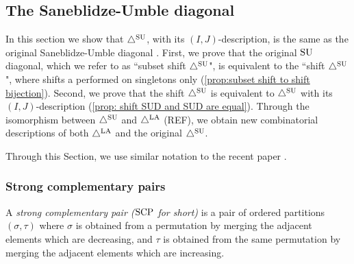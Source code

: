 
\subsection{The Saneblidze-Umble diagonal}

In this section we show that $\triangle^{\mathrm{SU}}$, with its $(I,J)$-description, is the same as the original Saneblidze-Umble diagonal \cite{SaneblidzeUmble04}.
First, we prove that the original $\mathrm{SU}$ diagonal, which we refer to as ``subset shift $\triangle^{\mathrm{SU}}$", is equivalent to the ``shift $\triangle^{\mathrm{SU}}$", where shifts a performed on singletons only (\cref{prop:subset shift to shift bijection}). 
Second, we prove that the shift $\triangle^{\mathrm{SU}}$ is equivalent to $\triangle^{\mathrm{SU}}$ with its $(I,J)$-description (\cref{prop: shift SUD and SUD are equal}). 
Through the isomorphism between $\triangle^{\mathrm{SU}}$ and $\triangle^{\mathrm{LA}}$ (REF), we obtain new combinatorial descriptions of both $\triangle^{\mathrm{LA}}$ and the original $\triangle^{\mathrm{SU}}$. 
\begin{center}
\end{center}
Through this Section, we use similar notation to the recent paper \cite{saneblidzeComparingDiagonalsAssociahedra2022}.


\subsubsection{Strong complementary pairs}

\begin{definition}
A \emph{strong complementary pair ($\mathrm{SCP}$ for short)} is a pair of ordered partitions $(\sigma,\tau)$ where $\sigma$ is obtained from a permutation by merging the adjacent elements which are decreasing, and $\tau$ is obtained from the same permutation by merging the adjacent elements which are increasing.
\end{definition}

